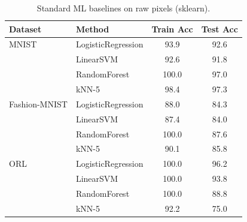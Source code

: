 \begin{table}[t]
\caption{Standard ML baselines on raw pixels (sklearn).}
\label{tab:baselines}
\centering
\small
\begin{tabular}{llcc}
\toprule
Dataset & Method & Train Acc & Test Acc \\
\midrule
MNIST & LogisticRegression & 93.9 & 92.6 \\
 & LinearSVM & 92.6 & 91.8 \\
 & RandomForest & 100.0 & 97.0 \\
 & kNN-5 & 98.4 & 97.3 \\
\midrule
Fashion-MNIST & LogisticRegression & 88.0 & 84.3 \\
 & LinearSVM & 87.4 & 84.0 \\
 & RandomForest & 100.0 & 87.6 \\
 & kNN-5 & 90.1 & 85.8 \\
\midrule
ORL & LogisticRegression & 100.0 & 96.2 \\
 & LinearSVM & 100.0 & 93.8 \\
 & RandomForest & 100.0 & 88.8 \\
 & kNN-5 & 92.2 & 75.0 \\
\bottomrule
\end{tabular}
\end{table}
